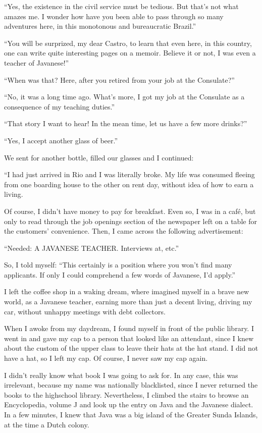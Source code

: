 \documentclass[a4paper,12pt]{book}
\begin{document}
``Yes, the existence in the civil service
must be tedious. But that's not
what amazes me. I wonder how have you been
able to pass through so many adventures here,
in this monotonous and bureaucratic Brazil.''

``You will be surprized, my dear Castro,
to learn that even here, in this country,
one can write quite interesting pages on a
memoir. Believe it or not,
I was even a teacher of Javanese!''

``When was that? Here, after you retired
from your job at the Consulate?''


``No, it was a long time ago.
What's more, I got my job at the
Consulate as a consequence of my
teaching duties.''

``That story I want to hear! In the mean time,
let us have a few more drinks?''

``Yes, I accept another glass of beer.''

We sent for another bottle, filled our glasses
and I continued:

``I had just arrived in Rio and I was literally broke.
My life was consumed fleeing
from one boarding house to
the other on rent day, without
idea of how to earn a living.

Of course, I didn't have money
to pay for breakfast.
Even so, I was in a café, but only to
read through the job openings section
of the newspaper left on a table
for the customers' convenience. Then, I came across
the following advertisement:


``Needed: A JAVANESE TEACHER.  Interviews at, etc.''

So, I told myself: ``This certainly is a position
where you won't find many applicants. If only I
could comprehend a few words of Javanese,
I'd apply.''

I left the coffee shop in a waking dream,
where imagined myself in a brave new world,
as a Javanese teacher,
earning more than just a decent living,
driving my car,
without unhappy meetings with debt collectors.

When I awoke from my daydream,
I found myself in front of the public library.
I went in and gave my cap to a
person that looked like an attendant,
since I knew about the custom of the
upper class to leave their hats at
the hat stand. I did not have
a hat, so I left my cap. Of course,
I never saw my cap again.

I didn't really know what
book I was going to ask for.
In any case, this was irrelevant,
because my name was nationally blacklisted,
since I never returned the books to
the highschool library. Nevertheless,
I climbed the stairs to browse
an Encyclopedia,
volume J and look up the entry on
Java and the Javanese dialect. 
In a few minutes, I knew that Java was a
big island of the Greater Sunda Islands,
at the time a Dutch colony.
\end{document}
